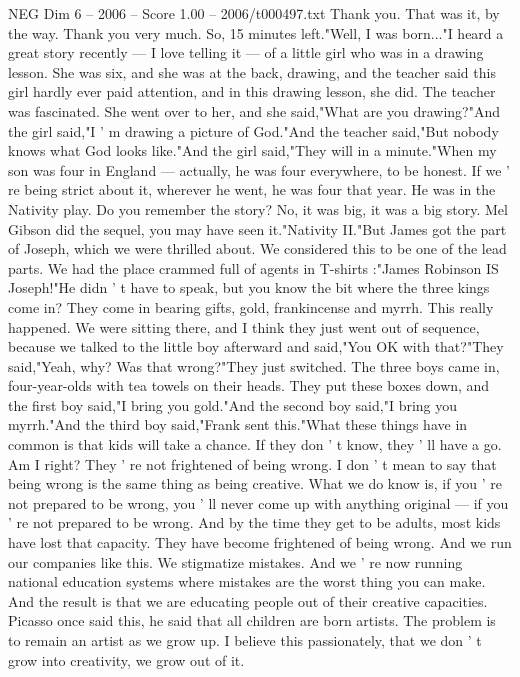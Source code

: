 \begin{textsample}{NEG Dim 6 – 2006 – Score 1.00 – 2006/t000497.txt}
Thank you.
That was it, by the way.
Thank you very much.
So, 15 minutes left."Well, I was born..."I heard a great story recently — I love telling it — of a little girl who was in a drawing lesson.
She was six, and she was at the back, drawing, and the teacher said this girl hardly ever paid attention, and in this drawing lesson, she did.
The teacher was fascinated.
She went over to her, and she said,"What are you drawing?"And the girl said,"I ' m drawing a picture of God."And the teacher said,"But nobody knows what God looks like."And the girl said,"They will in a minute."When my son was four in England — actually, he was four everywhere, to be honest.
If we ' re being strict about it, wherever he went, he was four that year.
He was in the Nativity play.
Do you remember the story?
No, it was big, it was a big story.
Mel Gibson did the sequel, you may have seen it."Nativity II."But James got the part of Joseph, which we were thrilled about.
We considered this to be one of the lead parts.
We had the place crammed full of agents in T-shirts :"James Robinson IS Joseph!"He didn ' t have to speak, but you know the bit where the three kings come in?
They come in bearing gifts, gold, frankincense and myrrh.
This really happened.
We were sitting there, and I think they just went out of sequence, because we talked to the little boy afterward and said,"You OK with that?"They said,"Yeah, why?
Was that wrong?"They just switched.
The three boys came in, four-year-olds with tea towels on their heads.
They put these boxes down, and the first boy said,"I bring you gold."And the second boy said,"I bring you myrrh."And the third boy said,"Frank sent this."What these things have in common is that kids will take a chance.
If they don ' t know, they ' ll have a go.
Am I right?
They ' re not frightened of being wrong.
I don ' t mean to say that being wrong is the same thing as being creative.
What we do know is, if you ' re not prepared to be wrong, you ' ll never come up with anything original — if you ' re not prepared to be wrong.
And by the time they get to be adults, most kids have lost that capacity.
They have become frightened of being wrong.
And we run our companies like this.
We stigmatize mistakes.
And we ' re now running national education systems where mistakes are the worst thing you can make.
And the result is that we are educating people out of their creative capacities.
Picasso once said this, he said that all children are born artists.
The problem is to remain an artist as we grow up.
I believe this passionately, that we don ' t grow into creativity, we grow out of it.

\end{textsample}
